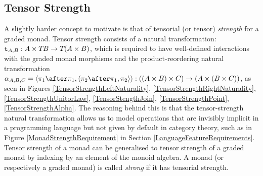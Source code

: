 \documentclass{Report}
\begin{document}
\subsection{Tensor Strength}
A slightly harder concept to motivate is that of tensorial (or tensor) \textit{strength} for a graded monad. Tensor strength consists of a natural transformation: $\texttt{t}_{A, B}: A \times T_{}{B} \rightarrow T_{}{(A \times B)}$, which is required to have well-defined interactions with the graded monad morphisms and the product-reordering natural transformation $\alpha_{A, B, C} = \pr{\p\after\p}{\pr{\pp\after\p}{\pp}}: ((A \times B) \times C) \rightarrow (A \times (B \times C))$, as seen in Figures \ref{TensorStrengthLeftNaturality}, \ref{TensorStrengthRightNaturality}, \ref{TensorStrengthUnitorLaw}, \ref{TensorStengthJoin}, \ref{TensorStrengthPoint}, \ref{TensorStrengthAlpha}. The reasoning behind this is that the tensor-strength natural transformation allows us to model operations that are invisibly implicit in a programming language but not given by default in category theory, such as in Figure \ref{MonadStrengthRequirement} in Section \ref{LanguageFeatureRequirements}. Tensor strength of a monad can be generalised to tensor strength of a graded monad by indexing by an element of the monoid algebra. A monad (or respectively a graded monad) is called \textit{strong} if it has tensorial strength. 
\end{document}
